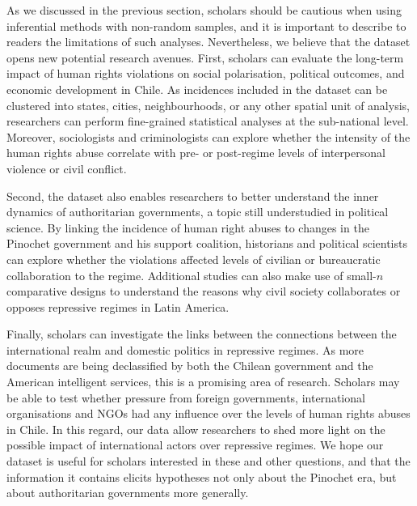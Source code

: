 \documentclass[a4paper,12pt]{article}
\begin{document}
As we discussed in the previous section, scholars should be cautious when using inferential methods with non-random samples, and it is important to describe to readers the limitations of such analyses. Nevertheless, we believe that the dataset opens new potential research avenues. First, scholars can evaluate the long-term impact of human rights violations on social polarisation, political outcomes, and economic development in Chile. As incidences included in the dataset can be clustered into states, cities, neighbourhoods, or any other spatial unit of analysis, researchers can perform fine-grained statistical analyses at the sub-national level. Moreover, sociologists and criminologists can explore whether the intensity of the human rights abuse correlate with pre- or post-regime levels of interpersonal violence or civil conflict.

Second, the dataset also enables researchers to better understand the inner dynamics of authoritarian governments, a topic still understudied in political science. By linking the incidence of human right abuses to changes in the Pinochet government and his support coalition, historians and political scientists can explore whether the violations affected levels of civilian or bureaucratic collaboration to the regime. Additional studies can also make use of small-$n$ comparative designs to understand the reasons why civil society collaborates or opposes repressive regimes in Latin America.

Finally, scholars can investigate the links between the connections between the international realm and domestic politics in repressive regimes. As more documents are being declassified by both the Chilean government and the American intelligent services, this is a promising area of research. Scholars may be able to test whether pressure from foreign governments, international organisations and NGOs had any influence over the levels of human rights abuses in Chile. In this regard, our data allow researchers to shed more light on the possible impact of international actors over repressive regimes. We hope our dataset is useful for scholars interested in these and other questions, and that the information it contains elicits hypotheses not only about the Pinochet era, but about authoritarian governments more generally.

\newpage
	


\end{document}
